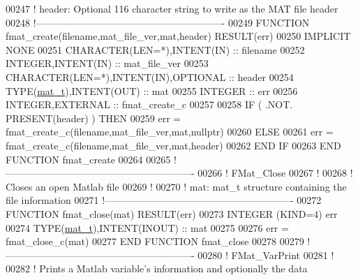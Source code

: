 \begin{DoxyCode}
00247 \textcolor{comment}{!   header:       Optional 116 character string to write as the MAT file header}
00248 \textcolor{comment}{!----------------------------------------------------------}
00249 \textcolor{keyword}{    FUNCTION }fmat\_create(filename,mat\_file\_ver,mat,header) \textcolor{keyword}{RESULT}(err)
00250     \textcolor{keywordtype}{IMPLICIT NONE}
00251         \textcolor{keywordtype}{CHARACTER(LEN=*)},\textcolor{keywordtype}{INTENT(IN)}           :: filename
00252         \textcolor{keywordtype}{INTEGER},\textcolor{keywordtype}{INTENT(IN)}                    :: mat\_file\_ver
00253         \textcolor{keywordtype}{CHARACTER(LEN=*)},\textcolor{keywordtype}{INTENT(IN)},\textcolor{keywordtype}{OPTIONAL}  :: header
00254         \textcolor{keywordtype}{TYPE}(\hyperlink{group___m_a_t_gab0fc888f5a5d79943b16284b1f91c2e8}{mat\_t}),\textcolor{keywordtype}{INTENT(OUT)}               :: mat
00255         \textcolor{keywordtype}{INTEGER}                               :: err
00256         \textcolor{keywordtype}{INTEGER},\textcolor{keywordtype}{EXTERNAL} :: fmat\_create\_c
00257 
00258         \textcolor{keywordflow}{IF} ( .NOT. \textcolor{keyword}{PRESENT}(header) ) \textcolor{keywordflow}{THEN}
00259             err = fmat\_create\_c(filename,mat\_file\_ver,mat,nullptr)
00260         \textcolor{keywordflow}{ELSE}
00261             err = fmat\_create\_c(filename,mat\_file\_ver,mat,header)
00262 \textcolor{keywordflow}{        END IF}
00263 \textcolor{keyword}{    END FUNCTION }fmat\_create
00264 
00265 \textcolor{comment}{!----------------------------------------------------------}
00266 \textcolor{comment}{!   FMat\_Close}
00267 \textcolor{comment}{!}
00268 \textcolor{comment}{!   Closes an open Matlab file}
00269 \textcolor{comment}{!}
00270 \textcolor{comment}{!   mat: mat\_t structure containing the file information}
00271 \textcolor{comment}{!----------------------------------------------------------}
00272 \textcolor{keyword}{    FUNCTION }fmat\_close(mat) \textcolor{keyword}{RESULT}(err)
00273         \textcolor{keywordtype}{INTEGER  (KIND=4)} err
00274         \textcolor{keywordtype}{TYPE}(\hyperlink{group___m_a_t_gab0fc888f5a5d79943b16284b1f91c2e8}{mat\_t}),\textcolor{keywordtype}{INTENT(INOUT)}  :: mat
00275 
00276         err = fmat\_close\_c(mat)
00277 \textcolor{keyword}{    END FUNCTION }fmat\_close
00278 
00279 \textcolor{comment}{!----------------------------------------------------------}
00280 \textcolor{comment}{!   FMat\_VarPrint}
00281 \textcolor{comment}{!}
00282 \textcolor{comment}{!   Prints a Matlab variable's information and optionally the data}

\end{DoxyCode}
